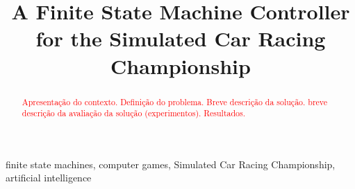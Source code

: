\documentclass[journal]{IEEEtran}%
\newcommand{\toDo}[1]{\textcolor{red}{#1}}%
\begin{document}
	\title{A Finite State Machine Controller for the Simulated Car Racing Championship}

\author{
	}

%
{}%

\maketitle

\begin{abstract}
\toDo{Apresentação do contexto. Definição do problema. Breve descrição da solução. breve descrição da avaliação da solução (experimentos). Resultados.}
\end{abstract}

\begin{IEEEkeywords}
finite state machines, computer games, Simulated Car Racing Championship, artificial intelligence
\end{IEEEkeywords}%

%
%
%
%
%
%

%
%
\end{document}
